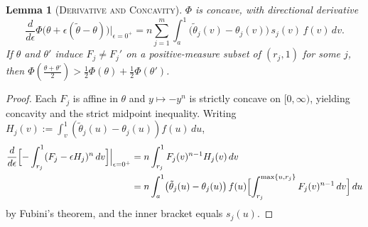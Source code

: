 \documentclass[12pt]{article}
\theoremstyle{mystyle}
\newtheorem{lemma}{Lemma}
\theoremstyle{mystyle2}
\newcommand{\1}{\mathbf{1}}
\begin{document}
\begin{lemma}[\textsc{Derivative and Concavity}]\label{lem:deriv}
$\Phi$ is concave, with directional derivative
\[
\frac{d}{d\epsilon}\Phi\bigl(\theta+\epsilon(\tilde\theta-\theta)\bigr)\Big|_{\epsilon=0^+} = n\sum_{j=1}^m \int_a^1 \bigl(\tilde\theta_j(v)-\theta_j(v)\bigr)\,s_j(v)\,f(v)\,dv.
\]
If $\theta$ and $\theta'$ induce $F_j\ne F_j'$ on a positive-measure subset of $(r_j,1)$ for some $j$, then $\Phi(\frac{\theta+\theta'}{2})>\frac{1}{2}\Phi(\theta)+\frac{1}{2}\Phi(\theta')$.
\end{lemma}
\begin{proof}
Each $F_j$ is affine in $\theta$ and $y\mapsto -y^n$ is strictly concave on $[0,\infty)$, yielding concavity and the strict midpoint inequality. Writing $H_j(v):=\int_v^1(\tilde\theta_j(u)-\theta_j(u))f(u)\,du$,
\begin{align*}
\frac{d}{d\epsilon}\Bigl[-\int_{r_j}^1(F_j-\epsilon H_j)^n\,dv\Bigr]\Big|_{\epsilon=0^+}
&= n\int_{r_j}^1 F_j(v)^{n-1}H_j(v)\,dv \\
&= n\int_a^1\bigl(\tilde\theta_j(u)-\theta_j(u)\bigr)\,f(u)\Bigl[\int_{r_j}^{\max\{u,r_j\}} F_j(v)^{n-1}\,dv\Bigr]\,du
\end{align*}
by Fubini's theorem, and the inner bracket equals $s_j(u)$.
\end{proof}
\end{document}
